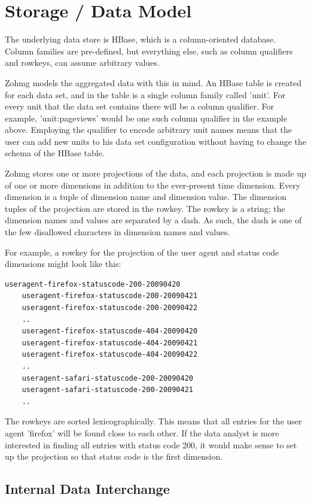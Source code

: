 \section{Storage / Data Model}

The underlying data store is HBase, which is a column-oriented database. Column
families are pre-defined, but everything else, such as column qualifiers and
rowkeys, can assume arbitrary values.

Zohmg models the aggregated data with this in mind. An HBase table is created
for each data set, and in the table is a single column family called 'unit'. For
every unit that the data set contains there will be a column qualifier. For
example, 'unit:pageviews' would be one such column qualifier in the example
above. Employing the qualifier to encode arbitrary unit names means that the
user can add new units to his data set configuration without having to change
the schema of the HBase table.

Zohmg stores one or more projections of the data, and each projection is made up
of one or more dimensions in addition to the ever-present time dimension. Every
dimension is a tuple of dimension name and dimension value. The dimension tuples
of the projection are stored in the rowkey. The rowkey is a string; the
dimension names and values are separated by a dash. As such, the dash is one of
the few disallowed characters in dimension names and values.

For example, a rowkey for the projection of the user agent and status code
dimensions might look like this:

\begin{lstlisting}[caption=Example of rowkeys,captionpos=b]
    useragent-firefox-statuscode-200-20090420
    useragent-firefox-statuscode-200-20090421
    useragent-firefox-statuscode-200-20090422
    ..
    useragent-firefox-statuscode-404-20090420
    useragent-firefox-statuscode-404-20090421
    useragent-firefox-statuscode-404-20090422
    ..
    useragent-safari-statuscode-200-20090420
    useragent-safari-statuscode-200-20090421
    ..
\end{lstlisting}

The rowkeys are sorted lexicographically. This means that all entries for the
user agent 'firefox' will be found close to each other. If the data analyst is
more interested in finding all entries with status code 200, it would make sense
to set up the projection so that status code is the first dimension.


\subsection{Internal Data Interchange}

